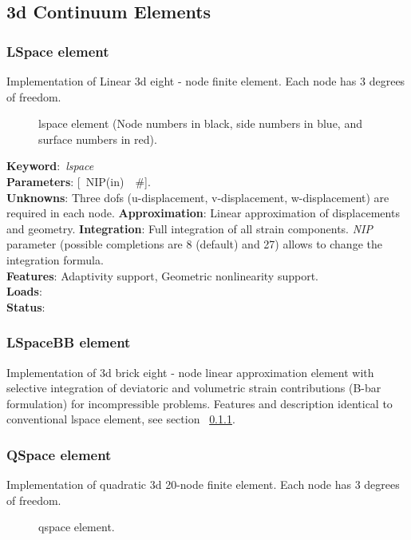 \documentclass[12pt,dvips]{article}
\newcommand{\descitem}[1]{{\noindent \bf #1}:}
\newcommand{\elemkeyword}[1]{\descitem{Keyword}~{\em #1}}
\newcommand{\elemparam}[2]{{{#1\tiny (#2)}~~\#}}
\newcommand{\optelemparam}[2]{{[~\elemparam{#1}{#2}]}}
\newcommand{\param}[1]{{\it #1}}
\begin{document}
\subsection{3d Continuum Elements}
\subsubsection{LSpace element}
\label{lspacesect}
Implementation of Linear 3d  eight - node 
finite element. Each node has 3 degrees of freedom.
\begin{figure}[tb]
  \centerline{}
\caption{lspace element (Node numbers in black, side numbers in blue,
and surface numbers in red).}
\end{figure}

\elemkeyword{lspace}\\
\descitem{Parameters} \optelemparam{NIP}{in}. \\
\descitem{Unknowns}
Three dofs (u-displacement, v-displacement, w-displacement) are required in each node.
\descitem{Approximation} Linear approximation of displacements and
geometry.
\descitem{Integration}
Full integration of all strain components.
\param{NIP} parameter (possible completions are 8 (default) and 27)
allows to change the integration formula.\\
\descitem{Features} Adaptivity support, Geometric nonlinearity support.\\
\descitem{Loads} \\
\descitem{Status} 

\subsubsection{LSpaceBB element}
Implementation of 3d brick  eight - node 
linear approximation element with selective integration of deviatoric and volumetric strain contributions (B-bar formulation) for incompressible problems. Features and description identical to conventional lspace element, see section ~\ref{lspacesect}.

\subsubsection{QSpace element}
Implementation of quadratic 3d  20-node 
finite element. Each node has 3 degrees of freedom.
\begin{figure}[tb]
\centerline{}
\caption{qspace element.}
\end{figure}
\end{document}
